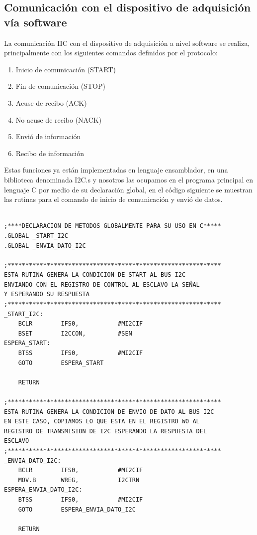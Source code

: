 \subsection{Comunicación con el dispositivo de adquisición vía software}

La comunicación IIC con el dispositivo de adquisición a nivel software se realiza, principalmente con los siguientes comandos definidos por el protocolo:

\begin{enumerate}
    \item Inicio de comunicación (START)
    \item Fin de comunicación (STOP)
    \item Acuse de recibo (ACK)
    \item No acuse de recibo (NACK)
    \item Envió de información
    \item Recibo de información
\end{enumerate}

Estas funciones ya están implementadas en lenguaje ensamblador, en una biblioteca denominada I2C.s y nosotros las ocupamos en el programa principal en lenguaje C por medio de su declaración global, en el código siguiente se muestran las rutinas para el comando de inicio de comunicación y envió de datos.

\begin{lstlisting}[language={[x86masm]Assembler}]

;****DECLARACION DE METODOS GLOBALMENTE PARA SU USO EN C*****
.GLOBAL	_START_I2C
.GLOBAL	_ENVIA_DATO_I2C

;************************************************************
ESTA RUTINA GENERA LA CONDICION DE START AL BUS I2C
ENVIANDO CON EL REGISTRO DE CONTROL AL ESCLAVO LA SEÑAL
Y ESPERANDO SU RESPUESTA
;************************************************************
_START_I2C:
	BCLR		IFS0,			#MI2CIF
	BSET		I2CCON,			#SEN
ESPERA_START:
	BTSS		IFS0,			#MI2CIF
	GOTO		ESPERA_START

	RETURN
	
;************************************************************
ESTA RUTINA GENERA LA CONDICION DE ENVIO DE DATO AL BUS I2C
EN ESTE CASO, COPIAMOS LO QUE ESTA EN EL REGISTRO W0 AL 
REGISTRO DE TRANSMISION DE I2C ESPERANDO LA RESPUESTA DEL
ESCLAVO
;************************************************************
_ENVIA_DATO_I2C:
	BCLR		IFS0,			#MI2CIF
	MOV.B		WREG,			I2CTRN
ESPERA_ENVIA_DATO_I2C:
	BTSS		IFS0,			#MI2CIF
	GOTO		ESPERA_ENVIA_DATO_I2C
	
	RETURN
	
\end{lstlisting}

